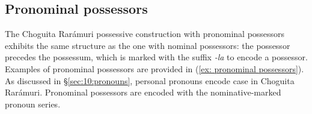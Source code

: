 \subsection{Pronominal possessors}
\label{subsubsec: pronominal possessors}

The Choguita Rarámuri possessive construction with pronominal possessors exhibits the same structure as the one with nominal possessors: the possessor precedes the possessum, which is marked with the suffix \textit{-la} to encode a possessor. Examples of pronominal possessors are provided in (\ref{ex: pronominal possessors}). As discussed in §\ref{sec:10:pronouns}, personal pronouns encode case in Choguita Rarámuri. Pronominal possessors are encoded with the nominative-marked pronoun series.


\ea\label{ex: pronominal possessors}

